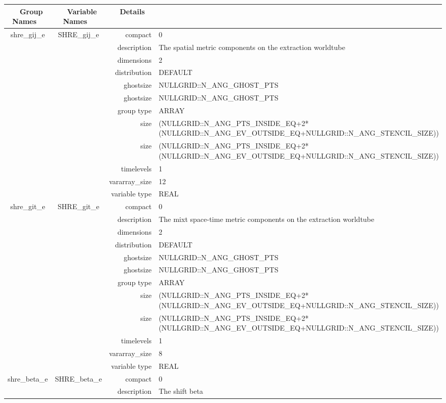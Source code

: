 \begin{tabular*}{150mm}{|c|c@{\extracolsep{\fill}}|rl|} \hline 
~ {\bf Group Names} ~ & ~ {\bf Variable Names} ~  &{\bf Details} ~ & ~ \\ 
\hline 
shre\_gij\_e & SHRE\_gij\_e & compact & 0 \\ 
 &  & description & The spatial metric components on the extraction worldtube \\ 
 &  & dimensions & 2 \\ 
 &  & distribution & DEFAULT \\ 
 &  & ghostsize & NULLGRID::N\_ANG\_GHOST\_PTS \\ 
& ~ & ghostsize & NULLGRID::N\_ANG\_GHOST\_PTS \\ 
 &  & group type & ARRAY \\ 
 &  & size & (NULLGRID::N\_ANG\_PTS\_INSIDE\_EQ+2*(NULLGRID::N\_ANG\_EV\_OUTSIDE\_EQ+NULLGRID::N\_ANG\_STENCIL\_SIZE)) \\ 
& ~ & size & (NULLGRID::N\_ANG\_PTS\_INSIDE\_EQ+2*(NULLGRID::N\_ANG\_EV\_OUTSIDE\_EQ+NULLGRID::N\_ANG\_STENCIL\_SIZE)) \\ 
 &  & timelevels & 1 \\ 
 &  & vararray\_size & 12 \\ 
 &  & variable type & REAL \\ 
\hline 
shre\_git\_e & SHRE\_git\_e & compact & 0 \\ 
 &  & description & The mixt space-time metric components on the extraction worldtube \\ 
 &  & dimensions & 2 \\ 
 &  & distribution & DEFAULT \\ 
 &  & ghostsize & NULLGRID::N\_ANG\_GHOST\_PTS \\ 
& ~ & ghostsize & NULLGRID::N\_ANG\_GHOST\_PTS \\ 
 &  & group type & ARRAY \\ 
 &  & size & (NULLGRID::N\_ANG\_PTS\_INSIDE\_EQ+2*(NULLGRID::N\_ANG\_EV\_OUTSIDE\_EQ+NULLGRID::N\_ANG\_STENCIL\_SIZE)) \\ 
& ~ & size & (NULLGRID::N\_ANG\_PTS\_INSIDE\_EQ+2*(NULLGRID::N\_ANG\_EV\_OUTSIDE\_EQ+NULLGRID::N\_ANG\_STENCIL\_SIZE)) \\ 
 &  & timelevels & 1 \\ 
 &  & vararray\_size & 8 \\ 
 &  & variable type & REAL \\ 
\hline 
shre\_beta\_e & SHRE\_beta\_e & compact & 0 \\ 
 &  & description & The shift beta \\ 

\end{tabular*}
